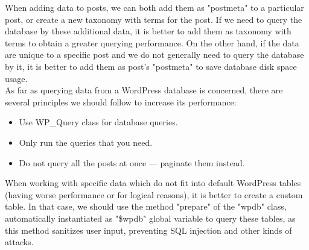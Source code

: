 When adding data to posts, we can both add them as "postmeta" to a particular post, or create a new taxonomy with terms for the post. If we need to query the database by these additional data, it is better to add them as taxonomy with terms to obtain a greater querying performance. On the other hand, if the data are unique to a specific post and we do not generally need to query the database by it, it is better to add them as post's "postmeta" to save database disk space usage. \cite{Otto:Taxonomy-vs-Postmeta} \\

As far as querying data from a WordPress database is concerned, there are several principles we should follow to increase its performance: \cite{10up:Database-Performance}

\begin{itemize}
	\item Use WP\_Query class for database queries.
	\item Only run the queries that you need.
	\item Do not query all the posts at once — paginate them instead.
\end{itemize}

When working with specific data which do not fit into default WordPress tables (having worse performance or for logical reasons), it is better to create a custom table. In that case, we should use the method "prepare" of the "wpdb" class, automatically instantiated as "\$wpdb" global variable to query these tables, as this method sanitizes user input, preventing SQL injection and other kinds of attacks.